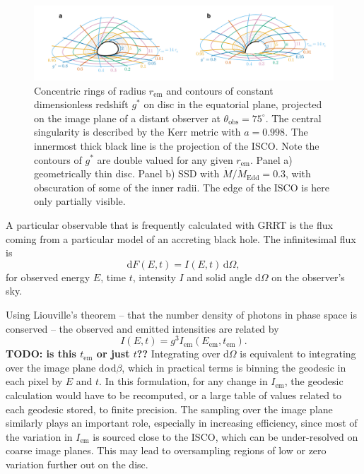 \documentclass[fleqn,usenatbib]{mnras}
\newcommand{\todo}[1]{{\noindent \bf \color{red} TODO: #1}}
\renewcommand{\d}{\text{d}}
\begin{document}
\begin{figure}
    \centering
    \includegraphics[width=0.95\linewidth]{figures/transfer-function.parameterization.pdf}
    \caption{Concentric rings of radius $r_\text{em}$ and contours of constant dimensionless redshift $g^\ast$ on disc in the equatorial plane, projected on the image plane of a distant observer at $\theta_\text{obs} = 75^\circ$. The central singularity is described by the Kerr metric with $a = 0.998$. The innermost thick black line is the projection of the ISCO. Note the contours of $g^\ast$ are double valued for any given $r_\text{em}$. Panel a) geometrically thin disc. Panel b) SSD with $\dot{M} / \dot{M}_\text{Edd} = 0.3$, with obscuration of some of the inner radii. The edge of the ISCO is here only partially visible.}
    \label{fig:transfer-parameterisation}
\end{figure}

A particular observable that is frequently calculated with GRRT is the flux coming from a particular model of an accreting black hole. The infinitesimal flux is
\begin{equation}
\label{eq:infinitesimal-flux}
\d F(E, t) = I\left(E, t\right)\, \d \Omega,
\end{equation}
for observed energy $E$, time $t$, intensity $I$ and solid angle $\d \Omega$ on the observer's sky.

Using Liouville's theorem -- that the number density of photons in phase space is conserved -- the observed and emitted intensities are related by
\begin{equation}
\label{eq:liouville-theorem}
    I\left( E, t \right) = g^3 I_\text{em}\left(E_\text{em}, t_\text{em}\right).
\end{equation}
\todo{is this $t_\text{em}$ or just $t$??}
Integrating over $\d \Omega$ is equivalent to integrating over the image plane $\d \alpha \d \beta$, which in practical terms is binning the geodesic in each pixel by $E$ and $t$. In this formulation, for any change in $I_\text{em}$, the geodesic calculation would have to be recomputed, or a large table of values related to each geodesic stored, to finite precision. The sampling over the image plane similarly plays an important role, especially in increasing efficiency, since most of the variation in $I_\text{em}$ is sourced close to the ISCO, which can be under-resolved on coarse image planes. This may lead to oversampling regions of low or zero variation further out on the disc.
\end{document}
